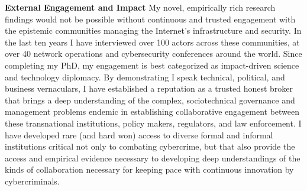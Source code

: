 \documentclass[11pt]{letter}
\begin{document}
\begin{letter}
\textbf{External Engagement and Impact} \vspace{0.2 \baselineskip} \newline %
%
My novel, empirically rich research findings would not be possible without continuous and trusted engagement with the epistemic communities managing the Internet's infrastructure and security.
%
In the last ten years I have interviewed over 100 actors across these communities, at over 40 network operations and cybersecurity conferences around the world.
%
%
%
%
Since completing my PhD, my engagement is best categorized as impact-driven science and technology diplomacy.
%
By demonstrating I speak technical, political, and business vernaculars, I have established a reputation as a trusted honest broker that brings a deep understanding of the complex, sociotechnical governance and management problems endemic in establishing collaborative engagement between these transnational institutions, policy makers, regulators, and law enforcement.
%
I have developed rare (and hard won) access to diverse formal and informal institutions critical not only to combating cybercrime, but that also provide the access and empirical evidence necessary to developing deep understandings of the kinds of collaboration necessary for keeping pace with continuous innovation by cybercriminals.
%



\end{letter}
\end{document}
